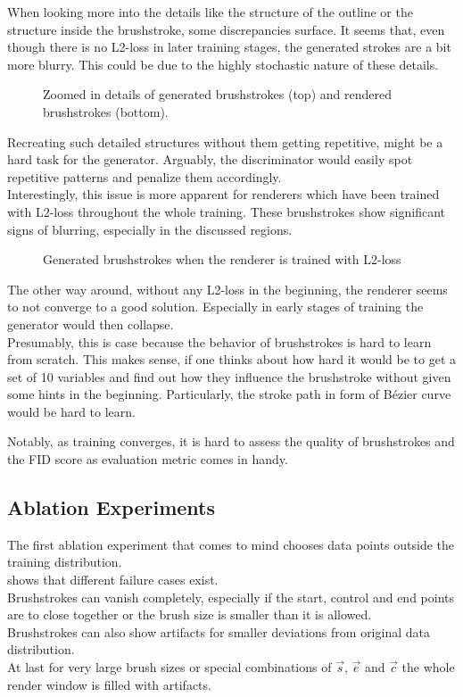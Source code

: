 When looking more into the details like the structure of the outline or the structure inside the brushstroke, some discrepancies surface.
It seems that, even though there is no L2-loss in later training stages, the generated strokes are a bit more blurry.
This could be due to the highly stochastic nature of these details.
\begin{figure*}
    \caption[]{Zoomed in details of generated brushstrokes (top) and rendered brushstrokes (bottom).}
\end{figure*}
Recreating such detailed structures without them getting repetitive, might be a hard task for the generator.
Arguably, the discriminator would easily spot repetitive patterns and penalize them accordingly.\\
Interestingly, this issue is more apparent for renderers which have been trained with L2-loss throughout the whole training.
These brushstrokes show significant signs of blurring, especially in the discussed regions.\\
\begin{figure*}
    \caption[]{Generated brushstrokes when the renderer is trained with L2-loss}
\end{figure*}
The other way around, without any L2-loss in the beginning, the renderer seems to not converge to a good solution.
Especially in early stages of training the generator would then collapse.\\
Presumably, this is case because the behavior of brushstrokes is hard to learn from scratch.
This makes sense, if one thinks about how hard it would be to get a set of 10 variables and find out how they influence the brushstroke without given some hints in the beginning.
Particularly, the stroke path in form of Bézier curve would be hard to learn.

Notably, as training converges, it is hard to assess the quality of brushstrokes and the FID score as evaluation metric comes in handy.

\subsection{Ablation Experiments}
The first ablation experiment that comes to mind chooses data points outside the training distribution.\\
 shows that different failure cases exist.\\
Brushstrokes can vanish completely, especially if the start, control and end points are to close together or the brush size is smaller than it is allowed.\\
Brushstrokes can also show artifacts for smaller deviations from original data distribution.\\
At last for very large brush sizes or special combinations of $\vec{s}$, $\vec{e}$ and $\vec{c}$ the whole render window is filled with artifacts.\\

